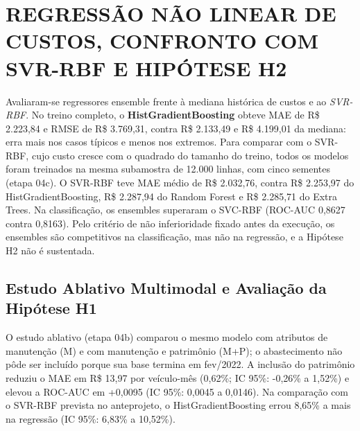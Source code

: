 \chapter{REGRESSÃO NÃO LINEAR DE CUSTOS, CONFRONTO COM SVR-RBF E HIPÓTESE H2}
\label{cap:regressao}

Avaliaram-se regressores ensemble frente à mediana histórica de custos e ao \textit{SVR-RBF}. No treino completo, o \textbf{HistGradientBoosting} obteve MAE de R\$ 2.223,84 e RMSE de R\$ 3.769,31, contra R\$ 2.133,49 e R\$ 4.199,01 da mediana: erra mais nos casos típicos e menos nos extremos. Para comparar com o SVR-RBF, cujo custo cresce com o quadrado do tamanho do treino, todos os modelos foram treinados na mesma subamostra de 12.000 linhas, com cinco sementes (etapa 04c). O SVR-RBF teve MAE médio de R\$ 2.032,76, contra R\$ 2.253,97 do HistGradientBoosting, R\$ 2.287,94 do Random Forest e R\$ 2.285,71 do Extra Trees. Na classificação, os ensembles superaram o SVC-RBF (ROC-AUC 0,8627 contra 0,8163). Pelo critério de não inferioridade fixado antes da execução, os ensembles são competitivos na classificação, mas não na regressão, e a Hipótese H2 não é sustentada.
\section{Estudo Ablativo Multimodal e Avaliação da Hipótese H1}

O estudo ablativo (etapa 04b) comparou o mesmo modelo com atributos de manutenção (M) e com manutenção e patrimônio (M+P); o abastecimento não pôde ser incluído porque sua base termina em fev/2022. A inclusão do patrimônio reduziu o MAE em R\$ 13,97 por veículo-mês (0,62\%; IC 95\%: -0,26\% a 1,52\%) e elevou a ROC-AUC em +0,0095 (IC 95\%: 0,0045 a 0,0146). Na comparação com o SVR-RBF prevista no anteprojeto, o HistGradientBoosting errou 8,65\% a mais na regressão (IC 95\%: 6,83\% a 10,52\%).
